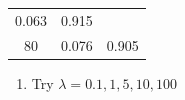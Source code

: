 \documentclass[]{article}
\providecommand{\tightlist}{%
  \setlength{\itemsep}{0pt}\setlength{\parskip}{0pt}}
\begin{document}
\begin{longtable}[]{@{}ccc@{}}
\begin{minipage}[t]{0.10\columnwidth}
0.063\strut
\end{minipage} & \begin{minipage}[t]{0.13\columnwidth}\centering\strut
0.915\strut
\end{minipage}\tabularnewline
\begin{minipage}[t]{0.09\columnwidth}\centering\strut
80\strut
\end{minipage} & \begin{minipage}[t]{0.10\columnwidth}\centering\strut
0.076\strut
\end{minipage} & \begin{minipage}[t]{0.13\columnwidth}\centering\strut
0.905\strut
\end{minipage}\tabularnewline
\bottomrule
\end{longtable}

\begin{enumerate}
\def\labelenumi{\arabic{enumi}.}
\setcounter{enumi}{4}
\tightlist
\item
  Try \(\lambda = 0.1, 1, 5, 10, 100\)
\end{enumerate}
\end{document}

